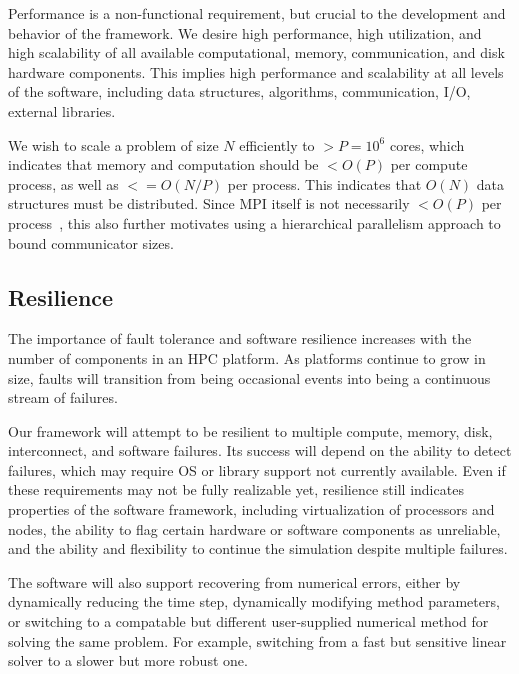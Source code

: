 \documentclass[10pt]{article}
\begin{document}
Performance is a non-functional requirement, but crucial to the
development and behavior of the framework.  We desire high
performance, high utilization, and high scalability of all available
computational, memory, communication, and disk hardware components.
This implies high performance and scalability at all levels of the
software, including data structures, algorithms, communication, I/O,
external libraries.

We wish to scale a problem of size $N$ efficiently to $> P = 10^6$
cores, which indicates that memory and computation should be $< O(P)$
per compute process, as well as $<= O(N/P)$ per process.  This
indicates that $O(N)$ data structures must be distributed.  Since MPI
itself is not necessarily $< O(P)$ per process~\cite{BaBu09}, this also
further motivates using a hierarchical parallelism approach to bound
communicator sizes.

\subsection{Resilience} \label{ss:require-resilience}

The importance of fault tolerance and software resilience increases
with the number of components in an HPC platform.  As platforms
continue to grow in size, faults will transition from being occasional
events into being a continuous stream of failures.

Our framework will attempt to be resilient to multiple compute,
memory, disk, interconnect, and software failures.  Its success will
depend on the ability to detect failures, which may require OS or
library support not currently available.  Even if these requirements
may not be fully realizable yet, resilience still indicates properties
of the software framework, including virtualization of processors and
nodes, the ability to flag certain hardware or software components as
unreliable, and the ability and flexibility to continue the simulation
despite multiple failures.

The software will also support recovering from numerical errors,
either by dynamically reducing the time step, dynamically modifying
method parameters, or switching to a compatable but different
user-supplied numerical method for solving the same problem.  For
example, switching from a fast but sensitive linear solver to a slower
but more robust one.
\end{document}
